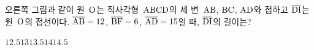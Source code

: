 \noindent\begin{minipage}[t]{0.58\linewidth}\vspace{0pt}\raggedright 오른쪽 그림과 같이 원~$\mathrm{O}$는 직사각형~$\mathrm{ABCD}$의 세 변~$\mathrm{AB}$, $\mathrm{BC}$, $\mathrm{AD}$와 접하고 $\overline{\mathrm{DI}}$는 원~$\mathrm{O}$의 접선이다. $\overline{\mathrm{AB}}=12$, $\overline{\mathrm{BF}}=6$, $\overline{\mathrm{AD}}=15$일 때, $\overline{\mathrm{DI}}$의 길이는? \end{minipage}\hfill\begin{minipage}[t]{0.4\linewidth}\vspace{0pt}\centering \resizebox{\ifdim\width>\linewidth\linewidth\else\width\fi}{!}{}\end{minipage}\par
\begin{choices32}{$12.5$}{$13$}{$13.5$}{$14$}{$14.5$}\end{choices32}
